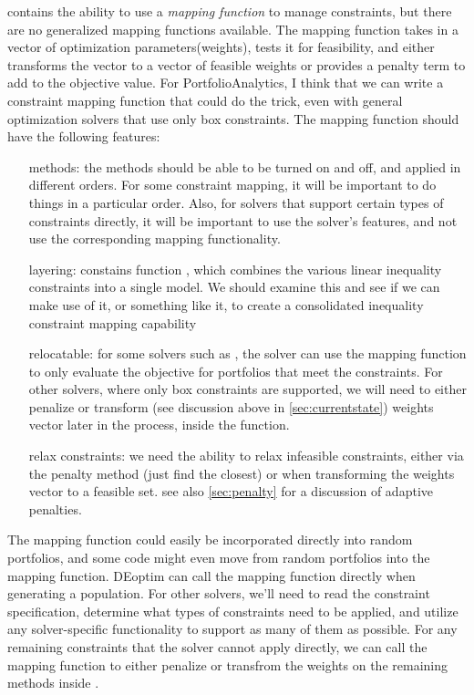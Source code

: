 \documentclass[12pt,letterpaper,english]{article}
\begin{document}
 contains the ability to use a \emph{mapping function} to manage constraints, but there are no generalized mapping functions available. The mapping function takes in a vector of optimization parameters(weights), tests it for feasibility, and either transforms the vector to a vector of feasible weights or provides a penalty term to add to the objective value. For PortfolioAnalytics, I think that we can write a constraint mapping function that could do the trick, even with general optimization solvers that use only box constraints.
The mapping function should have the following features:
	\begin{itemize}
		\item[methods:] the methods should be able to be turned on and off, and applied in different orders.  For some constraint mapping, it will be important to do things in a particular order.  Also, for solvers that support certain types of constraints directly, it will be important to use the solver's features, and not use the corresponding mapping functionality.
		\item[layering:]  constains function , which combines the various linear inequality constraints into a single model.  We should examine this and see if we can make use of it, or something like it, to create a consolidated inequality constraint mapping capability
		\item[relocatable:] for some solvers such as , the solver can use the mapping function to only evaluate the objective for portfolios that meet the constraints.  For other solvers, where only box constraints are supported, we will need to either penalize or transform (see discussion above in \ref{sec:currentstate}) weights vector later in the process, inside the  function.
		\item[relax constraints:]we need the ability to relax infeasible constraints, either via the penalty method (just find the closest) or when transforming the weights vector to a feasible set. see also \ref{sec:penalty} for a discussion of adaptive penalties.
		
	\end{itemize}
	
The mapping function could easily be incorporated directly into random portfolios, and some code might even move from random portfolios into the mapping function.  DEoptim can call the mapping function directly when generating a population.  For other solvers, we'll need to read the constraint specification, determine what types of constraints need to be applied, and utilize any solver-specific functionality to support as many of them as possible.  For any remaining constraints that the solver cannot apply directly, we can call the mapping function to either penalize or transfrom the weights on the remaining methods inside .
\end{document}
